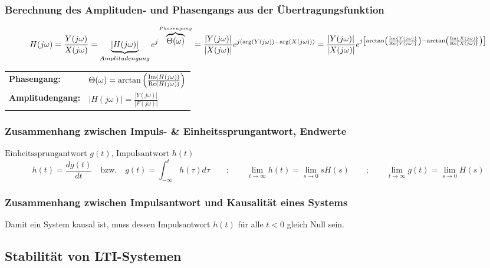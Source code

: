 		\subsubsection{Berechnung des Amplituden- und Phasengangs aus der Übertragungsfunktion}
			
			$$H(j \omega) = \frac{Y(j \omega)}{X(j \omega)} = \underbrace{|H(j
			\omega)|}_{Amplitudengang} e^{j\overbrace{\Theta(\omega)}^{Phasengang}} = 
			\frac{|Y(j \omega)|}{|X(j \omega)|} e^{j (\arg(Y(j \omega)) - \arg(X(j
			\omega)))} =
			\frac{|Y(j \omega)|}{|X(j \omega)|} e^{j \left[\arctan \left(\frac{\operatorname{Im}\{Y(j
			\omega)\}}{\operatorname{Re}\{Y(j \omega)\}} \right) - \arctan \left(\frac{\operatorname{Im}\{X(j
			\omega)\}}{\operatorname{Re}\{X(j \omega)\}} \right)\right]}$$
			
			\begin{tabular}{ll}
				\textbf{Phasengang:} & 
				$\Theta(\omega) = \arctan \left(\frac{\operatorname{Im} (H(j\omega))}{\operatorname{Re} (H(j\omega))}\right) \nonumber$ \\
				\textbf{Amplitudengang:} &
				$|H(j\omega)| = \frac{|Y(j\omega)|}{|F(j\omega)|} \nonumber$
			\end{tabular}
		
		
		\subsubsection{Zusammenhang zwischen Impuls- \& Einheitssprungantwort, Endwerte }
		
			$ \text{Einheitssprungantwort } g(t) \text{, Impulsantwort }h(t)$
			$$h(t)= \frac{d g(t)}{d t}\quad\text{bzw.}\quad
			g(t)=\int_{-\infty}^{t}h(\tau)d\tau \qquad;\qquad 
			\lim\limits_{t \rightarrow \infty}  h(t)= \lim\limits_{s \rightarrow 0} s H(s)
			\qquad;\qquad
			\lim\limits_{t \rightarrow \infty}  g(t)= \lim\limits_{s \rightarrow 0} H(s)$$
		
		
		\subsubsection{Zusammenhang zwischen Impulsantwort und Kausalität eines Systems }
		
			Damit ein System kausal ist, muss dessen Impulsantwort $h(t)$ für alle $t < 0$ gleich Null sein.\\
			
	\subsection{Stabilität von LTI-Systemen }
		\renewcommand{\arraystretchOriginal}{1}
